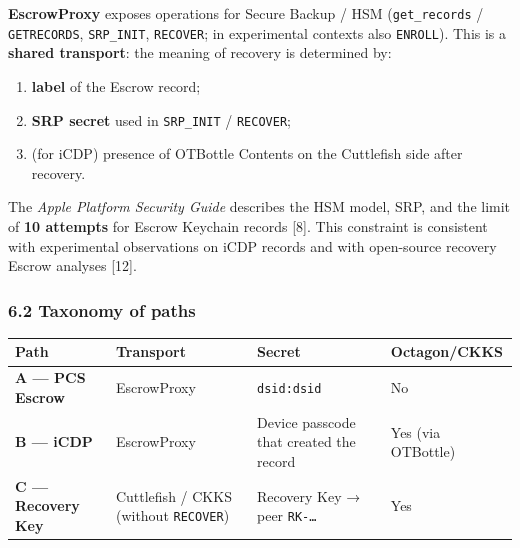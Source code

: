 \documentclass[
  english,
  10pt]{article}
\newcounter{none} %
\providecommand{\tightlist}{%
  \setlength{\itemsep}{0pt}\setlength{\parskip}{0pt}}
\begin{document}
\textbf{EscrowProxy} exposes operations for Secure Backup / HSM
(\texttt{get\_records} / \texttt{GETRECORDS}, \texttt{SRP\_INIT},
\texttt{RECOVER}; in experimental contexts also \texttt{ENROLL}). This
is a \textbf{shared transport}: the meaning of recovery is determined
by:

\begin{enumerate}
\def\labelenumi{\arabic{enumi}.}
\tightlist
\item
  \textbf{label} of the Escrow record;
\item
  \textbf{SRP secret} used in \texttt{SRP\_INIT} / \texttt{RECOVER};
\item
  (for iCDP) presence of OTBottle Contents on the Cuttlefish side after
  recovery.
\end{enumerate}

The \emph{Apple Platform Security Guide} describes the HSM model, SRP,
and the limit of \textbf{10 attempts} for Escrow Keychain records
{[}8{]}. This constraint is consistent with experimental observations on
iCDP records and with open-source recovery Escrow analyses {[}12{]}.

\subsubsection{6.2 Taxonomy of paths}\label{taxonomy-of-paths}

{\def\LTcaptype{none} %
\begin{longtable}[]{@{}
  >{\raggedright\arraybackslash}p{}
  >{\raggedright\arraybackslash}p{}
  >{\raggedright\arraybackslash}p{}
  >{\raggedright\arraybackslash}p{}@{}}
\toprule\noalign{}
\begin{minipage}[b]{\linewidth}\raggedright
Path
\end{minipage} & \begin{minipage}[b]{\linewidth}\raggedright
Transport
\end{minipage} & \begin{minipage}[b]{\linewidth}\raggedright
Secret
\end{minipage} & \begin{minipage}[b]{\linewidth}\raggedright
Octagon/CKKS
\end{minipage} \\
\midrule\noalign{}
\endhead
\bottomrule\noalign{}
\endlastfoot
\textbf{A --- PCS Escrow} & EscrowProxy & \texttt{dsid:dsid} & No \\
\textbf{B --- iCDP} & EscrowProxy & Device passcode that created the
record & Yes (via OTBottle) \\
\textbf{C --- Recovery Key} & Cuttlefish / CKKS (without
\texttt{RECOVER}) & Recovery Key → peer \texttt{RK-…} & Yes \\
\end{longtable}
}
\end{document}
